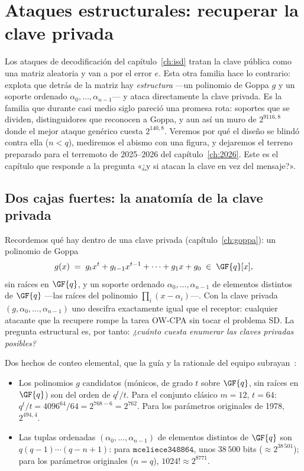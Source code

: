\chapter{Ataques estructurales: recuperar la clave privada}\label{ch:estructura}

\begin{roadmap}
Los ataques de decodificación del capítulo~\ref{ch:isd} tratan la
clave pública como una matriz aleatoria y van a por el error $e$.
Esta otra familia hace lo contrario: explota que detrás de la matriz
hay \emph{estructura} ---un polinomio de Goppa $g$ y un soporte
ordenado $\alpha_0,\dots,\alpha_{n-1}$--- y ataca directamente la
clave privada. Es la familia que durante casi medio siglo pareció
una promesa rota: soportes que se dividen, distinguidores que
reconocen a Goppa, y aun así un muro de $2^{9116{,}8}$ donde el
mejor ataque genérico cuesta $2^{140{,}8}$. Veremos por qué el diseño
se blindó contra ella ($n<q$), mediremos el abismo con una figura, y
dejaremos el terreno preparado para el terremoto de 2025--2026 del
capítulo~\ref{ch:2026}. Este es el capítulo que responde a la
pregunta «¿y si atacan la clave en vez del mensaje?».
\end{roadmap}

\section{Dos cajas fuertes: la anatomía de la clave privada}

Recordemos qué hay dentro de una clave privada (capítulo~\ref{ch:goppa}):
un polinomio de Goppa
\[
  g(x) \;=\; g_t x^{t} + g_{t-1}x^{t-1} + \cdots + g_1 x + g_0
  \;\in\; \GF{q}[x],
\]
sin raíces en $\GF{q}$, y un soporte ordenado
$\alpha_0,\dots,\alpha_{n-1}$ de elementos distintos de $\GF{q}$
---las raíces del polinomio $\prod_i (x-\alpha_i)$---. Con la clave
privada $(g,\alpha_0,\dots,\alpha_{n-1})$ uno descifra exactamente
igual que el receptor: cualquier atacante que la recupere rompe la
tarea OW-CPA sin tocar el problema SD. La pregunta estructural es,
por tanto: \emph{¿cuánto cuesta enumerar las claves privadas
posibles?}

Dos hechos de conteo elemental, que la guía y la rationale del
equipo subrayan~\cite{cmsecurity,cmrationale}:

\begin{itemize}[leftmargin=1.5em,itemsep=3pt]
  \item Los polinomios $g$ candidatos (mónicos, de grado $t$ sobre
        $\GF{q}$, sin raíces en $\GF{q}$) son del orden de $q^{t}/t$.
        Para el conjunto clásico $m=12$, $t=64$: $q^{t}/t =
        4096^{64}/64 = 2^{768-6} = 2^{762}$. Para los parámetros
        originales de 1978, $2^{494{,}4}$.
  \item Las tuplas ordenadas $(\alpha_0,\dots,\alpha_{n-1})$ de
        elementos distintos de $\GF{q}$ son $q(q-1)\cdots(q-n+1)$:
        para $\texttt{mceliece348864}$, unos $38\,500$ bits
        ($\approx 2^{38\,501}$); para los parámetros originales
        ($n=q$), $1024!\approx 2^{8771}$.
\end{itemize}

